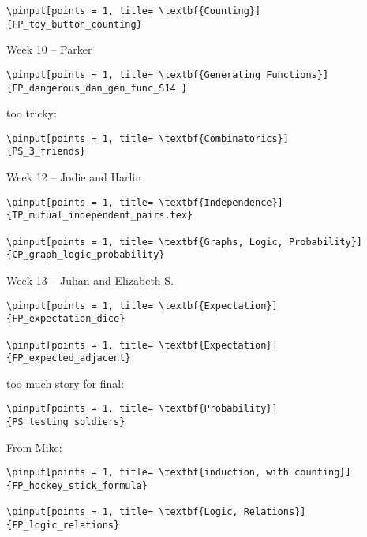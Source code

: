 \documentclass[quiz]{mcs}
\begin{document}
\begin{staffnotes}
\begin{verbatim}
\pinput[points = 1, title= \textbf{Counting}]
{FP_toy_button_counting}

\end{verbatim}

\begin{center}
{\large Week 10 -- Parker}
\end{center}

\begin{verbatim}
\pinput[points = 1, title= \textbf{Generating Functions}]
{FP_dangerous_dan_gen_func_S14 }
\end{verbatim}

too tricky:
\begin{verbatim}
\pinput[points = 1, title= \textbf{Combinatorics}]
{PS_3_friends}
\end{verbatim}

\begin{center}
{\large Week 12 -- Jodie and Harlin}
\end{center}

\begin{verbatim}
\pinput[points = 1, title= \textbf{Independence}]
{TP_mutual_independent_pairs.tex}

\pinput[points = 1, title= \textbf{Graphs, Logic, Probability}]
{CP_graph_logic_probability}

\end{verbatim}

\begin{center}
{\large Week 13 -- Julian and Elizabeth S.}
\end{center}

\begin{verbatim}
\pinput[points = 1, title= \textbf{Expectation}]
{FP_expectation_dice}

\pinput[points = 1, title= \textbf{Expectation}]
{FP_expected_adjacent}

\end{verbatim}

too much story for final:
\begin{verbatim}
\pinput[points = 1, title= \textbf{Probability}]
{PS_testing_soldiers}
\end{verbatim}

From Mike:

\begin{verbatim}
\pinput[points = 1, title= \textbf{induction, with counting}]
{FP_hockey_stick_formula}

\pinput[points = 1, title= \textbf{Logic, Relations}]
{FP_logic_relations}


\end{verbatim}
\end{staffnotes}
\end{document}
